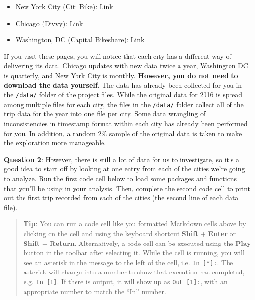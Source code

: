 \documentclass[11pt]{article}
\providecommand{\tightlist}{%
      \setlength{\itemsep}{0pt}\setlength{\parskip}{0pt}}
\begin{document}
\begin{itemize}
\tightlist
\item
  New York City (Citi Bike):
  \href{https://www.citibikenyc.com/system-data}{Link}
\item
  Chicago (Divvy): \href{https://www.divvybikes.com/system-data}{Link}
\item
  Washington, DC (Capital Bikeshare):
  \href{https://www.capitalbikeshare.com/system-data}{Link}
\end{itemize}

If you visit these pages, you will notice that each city has a different
way of delivering its data. Chicago updates with new data twice a year,
Washington DC is quarterly, and New York City is monthly.
\textbf{However, you do not need to download the data yourself.} The
data has already been collected for you in the \texttt{/data/} folder of
the project files. While the original data for 2016 is spread among
multiple files for each city, the files in the \texttt{/data/} folder
collect all of the trip data for the year into one file per city. Some
data wrangling of inconsistencies in timestamp format within each city
has already been performed for you. In addition, a random 2\% sample of
the original data is taken to make the exploration more manageable.

\textbf{Question 2}: However, there is still a lot of data for us to
investigate, so it's a good idea to start off by looking at one entry
from each of the cities we're going to analyze. Run the first code cell
below to load some packages and functions that you'll be using in your
analysis. Then, complete the second code cell to print out the first
trip recorded from each of the cities (the second line of each data
file).

\begin{quote}
\textbf{Tip}: You can run a code cell like you formatted Markdown cells
above by clicking on the cell and using the keyboard shortcut
\textbf{Shift} + \textbf{Enter} or \textbf{Shift} + \textbf{Return}.
Alternatively, a code cell can be executed using the \textbf{Play}
button in the toolbar after selecting it. While the cell is running, you
will see an asterisk in the message to the left of the cell, i.e.
\texttt{In\ {[}*{]}:}. The asterisk will change into a number to show
that execution has completed, e.g. \texttt{In\ {[}1{]}}. If there is
output, it will show up as \texttt{Out\ {[}1{]}:}, with an appropriate
number to match the ``In'' number.
\end{quote}
\end{document}
